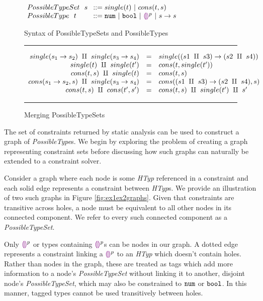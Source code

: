 \begin{figure}[htbp]
\centering
\vspace{-3px} 
$\arraycolsep=4pt\begin{array}{lll}
PossibleTypeSet~~ s & ::= 
single(t) ~\vert~ 
cons(t, s)
\\
PossibleType~~ t & ::= 
  \tnum ~\vert~
  \tbool ~\vert~
  \ehole^p ~\vert~
  \tarr{s}{s}
  \\
\end{array}$
\label{fig:syntax_possible_type_sets}
\caption{Syntax of PossibleTypeSets and PossibleTypes}
\vspace{5px} 
\hrule
\[\begin{array}{rcl}
    single(s_1 \rightarrow s_2) ~\amalg~ single(s_3 \rightarrow s_4) & = & single({(s1 ~\amalg~ s3) \rightarrow (s2 ~\amalg~ s4)}) \\
    single(t) ~\amalg~ single(t') & = & cons(t, single(t')) \\
    cons(t,s) ~\amalg~ single(t) & = & cons(t, s) \\
    cons(s_1 \rightarrow s_2, s) ~\amalg~ single(s_3 \rightarrow s_4) & = & cons((s1 ~\amalg~ s3) \rightarrow (s2 ~\amalg~ s4) , s) \\
    cons(t,s) ~\amalg~ cons(t',s') & = & cons(t,s) ~\amalg~ single(t') ~\amalg~ s' \\
\end{array}\] 
\caption{Merging PossibleTypeSets}
\vspace{5px} 
\hrule
\label{fig:merging_possible_type_sets}
\vspace{-5px}
\end{figure}

 The set of constraints returned by static analysis can be used to construct a graph of \textit{PossibleType}s. We begin by exploring the problem of creating a graph representing constraint sets before discussing how such graphs can naturally be extended to a constraint solver. 
 
 Consider a graph where each node is some \textit{HTyp} referenced in a constraint and each solid edge represents a constraint between \textit{HTyp}s. We provide an illustration of two such graphs in Figure \ref{fig:ex1ex2graphs}. Given that constraints are transitive across holes, a node must be equivalent to all other nodes in its connected component. We refer to every such connected component as a \textit{PossibleTypeSet}. 

Only $\textcolor{violet}{\llparenthesis}\textcolor{violet}{\rrparenthesis}^{p}$ or types containing $\textcolor{violet}{\llparenthesis}\textcolor{violet}{\rrparenthesis}^{p}$s can be nodes in our graph. A dotted edge represents a constraint linking a $\textcolor{violet}{\llparenthesis}\textcolor{violet}{\rrparenthesis}^{p}$ to an \textit{HTyp} which doesn't contain holes. Rather than nodes in the graph, these are treated as tags which add more information to a node's \textit{PossibleTypeSet} without linking it to another, disjoint node's \textit{PossibleTypeSet}, which may also be constrained to $\mathtt{num}$ or $\mathtt{bool}$. In this manner, tagged types cannot be used transitively between holes.


